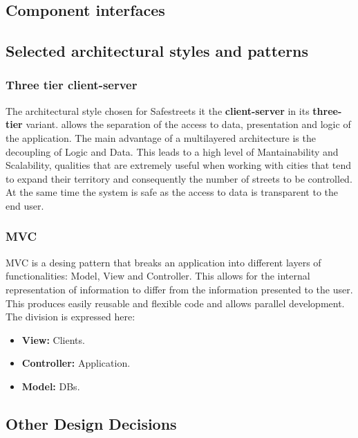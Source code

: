 \subsection{Component interfaces}

\subsection{Selected architectural styles and patterns}

\subsubsection{Three tier client-server}

The architectural style chosen for Safestreets it the \textbf{client-server} in its \textbf{three-tier} variant.  allows the 
separation of the access to data, presentation and logic of the application.
The main advantage of a multilayered architecture is the decoupling of Logic and Data. This leads to a high level of Mantainability and Scalability, 
qualities that are extremely useful when working with cities that tend to expand their territory and consequently the number of streets to be controlled.
At the same time the system is safe as the access to data is transparent to the end user.

\subsubsection{MVC}

MVC is a desing pattern that breaks an application into different layers	of functionalities:	Model, View and Controller.
This allows for the internal representation of information to differ from the information presented to the user. 
This produces easily reusable and flexible code and allows parallel development. The division is expressed here:

\begin{itemize}
    \item \textbf{View:} Clients.
    \item \textbf{Controller:} Application.
    \item \textbf{Model:} DBs.
    
    
\end{itemize}

\subsection{Other Design Decisions}

